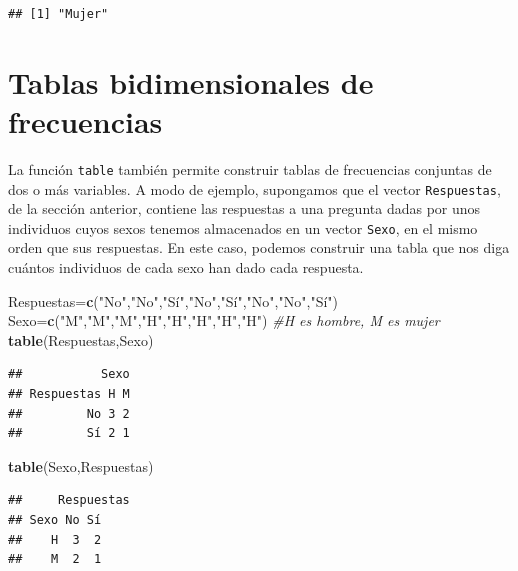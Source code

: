 \documentclass[]{book}
\newenvironment{Shaded}{\begin{snugshade}}{\end{snugshade}}
\newcommand{\CommentTok}[1]{\textcolor[rgb]{0.56,0.35,0.01}{\textit{#1}}}
\newcommand{\KeywordTok}[1]{\textcolor[rgb]{0.13,0.29,0.53}{\textbf{#1}}}
\newcommand{\NormalTok}[1]{#1}
\newcommand{\StringTok}[1]{\textcolor[rgb]{0.31,0.60,0.02}{#1}}
\theoremstyle{definition}
\theoremstyle{definition}
\theoremstyle{definition}
\theoremstyle{remark}
\begin{document}
\begin{verbatim}
## [1] "Mujer"
\end{verbatim}

\hypertarget{tablas-bidimensionales-de-frecuencias}{%
\section{Tablas bidimensionales de frecuencias}\label{tablas-bidimensionales-de-frecuencias}}

La función \texttt{table} también permite construir tablas de frecuencias conjuntas de dos o más variables. A modo de ejemplo, supongamos que el vector \texttt{Respuestas}, de la sección anterior, contiene las respuestas a una pregunta dadas por unos individuos cuyos sexos tenemos almacenados en un vector \texttt{Sexo}, en el mismo orden que sus respuestas. En este caso, podemos construir una tabla que nos diga cuántos individuos de cada sexo han dado cada respuesta.

\begin{Shaded}
\begin{Highlighting}[]
\NormalTok{Respuestas=}\KeywordTok{c}\NormalTok{(}\StringTok{"No"}\NormalTok{,}\StringTok{"No"}\NormalTok{,}\StringTok{"Sí"}\NormalTok{,}\StringTok{"No"}\NormalTok{,}\StringTok{"Sí"}\NormalTok{,}\StringTok{"No"}\NormalTok{,}\StringTok{"No"}\NormalTok{,}\StringTok{"Sí"}\NormalTok{)}
\NormalTok{Sexo=}\KeywordTok{c}\NormalTok{(}\StringTok{"M"}\NormalTok{,}\StringTok{"M"}\NormalTok{,}\StringTok{"M"}\NormalTok{,}\StringTok{"H"}\NormalTok{,}\StringTok{"H"}\NormalTok{,}\StringTok{"H"}\NormalTok{,}\StringTok{"H"}\NormalTok{,}\StringTok{"H"}\NormalTok{) }\CommentTok{#H es hombre, M es mujer}
\KeywordTok{table}\NormalTok{(Respuestas,Sexo)}
\end{Highlighting}
\end{Shaded}

\begin{verbatim}
##           Sexo
## Respuestas H M
##         No 3 2
##         Sí 2 1
\end{verbatim}

\begin{Shaded}
\begin{Highlighting}[]
\KeywordTok{table}\NormalTok{(Sexo,Respuestas)}
\end{Highlighting}
\end{Shaded}

\begin{verbatim}
##     Respuestas
## Sexo No Sí
##    H  3  2
##    M  2  1
\end{verbatim}
\end{document}
